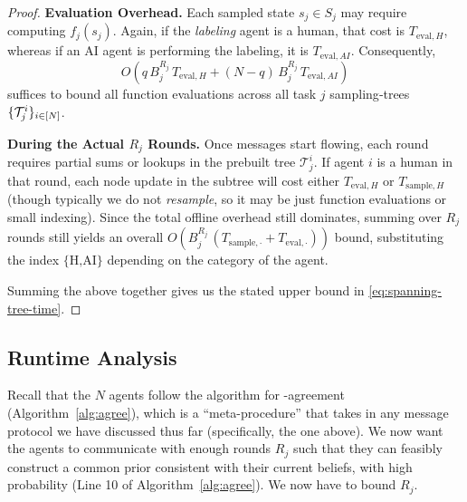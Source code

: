 \begin{proof}
\textbf{Evaluation Overhead.} Each sampled state $s_j\in S_j$ may require computing $f_j(s_j)$.  Again, if the \emph{labeling} agent is a human, that cost is $T_{\text{eval},H}$, whereas if an AI agent is performing the labeling, it is $T_{\text{eval},AI}$.
  Consequently,
  \begin{equation*}
    O\left(q\,B_j^{R_j}\,T_{\text{eval},H} + (N-q)\,B_j^{R_j}\,T_{\text{eval},AI}\right)
  \end{equation*}
  suffices to bound all function evaluations across all task $j$ sampling‐trees $\{\mathcal{T}^i_j\}_{i\in[N]}$.

\textbf{During the Actual $R_j$ Rounds.} Once messages start flowing, each round requires partial sums or lookups in the prebuilt tree $\mathcal{T}^i_j$.
If agent $i$ is a human in that round, each node update in the subtree will cost either $T_{\text{eval},H}$ or $T_{\text{sample},H}$ (though typically we do not \emph{resample}, so it may be just function evaluations or small indexing).
Since the total offline overhead still dominates, summing over $R_j$ rounds still yields an overall $O\left(B_j^{R_j}\,(T_{\text{sample},\cdot} + T_{\text{eval},\cdot})\right)$ bound, substituting the index $\{\text{H,AI}\}$ depending on the category of the agent.
\newline

Summing the above together gives us the stated upper bound in \eqref{eq:spanning-tree-time}.
\end{proof}

\subsection{Runtime Analysis}
\label{app:runtime}
Recall that the $N$ agents follow the algorithm for \agree-agreement (Algorithm~\ref{alg:agree}), which is a ``meta-procedure'' that takes in any message protocol we have discussed thus far (specifically, the one above).
We now want the agents to communicate with enough rounds $R_j$ such that they can feasibly construct a common prior consistent with their current beliefs, with high probability (Line 10 of Algorithm~\ref{alg:agree}).
We now have to bound $R_j$.

